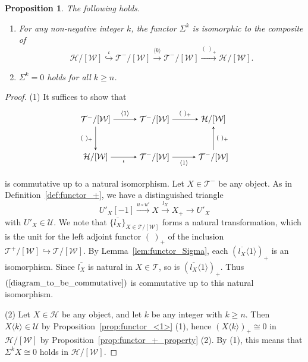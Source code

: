 \documentclass[a4paper,reqno,10pt]{amsart}
\DeclareRobustCommand{\darkblueedit}[1]{#1}
\newtheorem{proposition}[proposition]{Proposition}
\theoremstyle{definition}
\theoremstyle{definition}
\theoremstyle{definition}
\theoremstyle{definition}
\theoremstyle{plain}
\newcommand{\CH}{\mathcal{H}}
\newcommand{\CT}{\mathcal{T}}
\newcommand{\CU}{\mathcal{U}}
\newcommand{\CW}{\mathcal{W}}
\begin{document}
\begin{proposition}\label{prop:functor_Sigma}
The following holds.
\begin{enumerate}
\item For any non-negative integer $k$, the functor $\Sigma^k$ is isomorphic to the composite of 
\[
\CH/[\CW]\overset{\iota}{\hookrightarrow}\CT^-/[\CW]\xrightarrow{\langle  k\rangle}\CT^-/[\CW]\xrightarrow{(\ )_+}\CH/[\CW].
\]
\item $\Sigma^k=0$ holds for all $k\ge n$.
\end{enumerate}
\end{proposition}
\begin{proof}
{\rm (1)} It suffices to show that
\begin{equation}\label{diagram_to_be_commutative}
\begin{tikzpicture}[>=stealth]
\node (1) at (-2.5,0.8) {$\CT^-/[\CW]$};
\node (2) at (0,0.8) {$\CT^-/[\CW]$};
\node (3) at (-2.5,-0.8) {$\CH/[\CW]$};
\node (4) at (0,-0.8) {$\CT^-/[\CW]$};
\node (5) at (2.5,-0.8) {$\CT^-/[\CW]$};
\node (6) at (2.5,0.8) {$\CH/[\CW]$};
\draw[->] (1) -- node[above,font=\scriptsize] {$\langle1\rangle$} (2);
\draw[->] (2) -- node[above,font=\scriptsize] {$(\ )_+$} (6);
\draw[->] (1) -- node[left,font=\scriptsize] {$(\ )_+$} (3);
\draw[->] (3) -- node[below,font=\scriptsize] {$\iota$} (4);
\draw[->] (4) -- node[below,font=\scriptsize] {$\langle1\rangle$} (5);
\draw[->] (5) -- node[right,font=\scriptsize] {$(\ )_+$} (6);
\end{tikzpicture}
\end{equation}
is commutative up to a natural isomorphism.
Let $X\in\CT^-$ be any object. 
As in Definition~\ref{def:functor_+}, we have a distinguished triangle
\[
U'_X[-1]\xrightarrow{u\circ u'}X\xrightarrow{l_X}X_+\to U'_X
\]
with $U'_X\in\CU$.
We note that $\{\overline{l_X}\}_{X\in\CT/[\CW]}$ forms a natural transformation, which is the unit for the left adjoint functor $(\ )_+$ of the inclusion $\CT^+/[\CW]\hookrightarrow\CT/[\CW]$.
By Lemma~\ref{lem:functor_Sigma}, each
\darkblueedit{$(\overline{l_X}\langle1\rangle)_+$}
is an isomorphism.
Since $\overline{l_X}$ is natural in $X\in\CT$, so is $(\overline{l_X}\langle1\rangle)_+$.  
Thus $(\ref{diagram_to_be_commutative})$ is commutative up to this natural isomorphism.

{\rm (2)} Let $X\in\CH$ be any object, and let $k$ be any integer with $k\ge n$. Then $X\langle k\rangle\in\CU$ by Proposition~\ref{prop:functor_<1>} {\rm (1)}, hence $(X\langle k\rangle)_+\cong 0$ in $\CH/[\CW]$ by Proposition~\ref{prop:functor_+_property} {\rm (2)}. By {\rm (1)}, this means that $\Sigma^kX\cong 0$ holds in $\CH/[\CW]$.
\end{proof}
\end{document}
